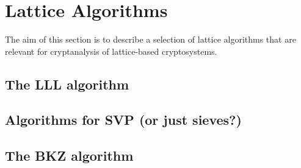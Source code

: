 \section{Lattice Algorithms}
\label{se:algs}

The aim of this section is to describe a selection of lattice algorithms that are 
relevant for cryptanalysis of lattice-based cryptosystems. 

\subsection{The LLL algorithm} 

\subsection{Algorithms for SVP (or just sieves?)} 

\subsection{The BKZ algorithm} 